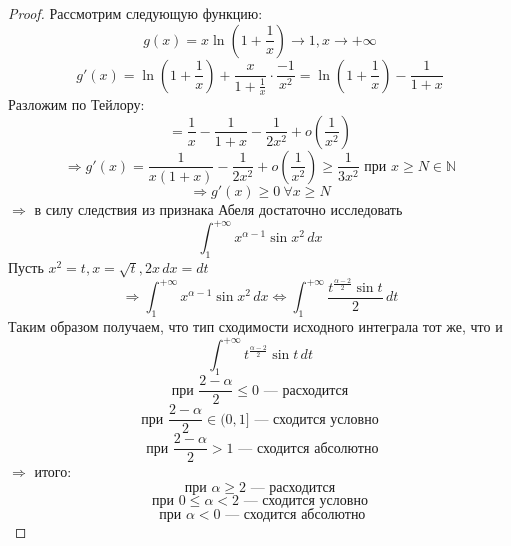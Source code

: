 \documentclass[11pt]{article}
\begin{document}
\begin{proof}
    Рассмотрим следующую функцию:
    \[ g(x) = x\ln \left(1+\frac{1}{x}\right)\to 1, x\to +\infty \]
    \[ g'(x) = \ln \left(1+\frac{1}{x}\right) +  \frac{x}{1+\frac{1}{x}} \cdot \frac{-1}{x^2}  = \ln\left(1+\frac{1}{x}\right) - \frac{1}{1+x}  \] 
    Разложим по Тейлору:
    \[ = \frac{1}{x} - \frac{1}{1+x} - \frac{1}{2x^2} + o\left(\frac{1}{x^2}\right) \]
    \[ \Rightarrow g'(x) =   \frac{1}{x(1+x)} - \frac{1}{2x^2} + o\left(\frac{1}{x^2} \right)\ge \frac{1}{3x^2} \text{ при } x\ge N\in \mathbb{N} \] 
    \[ \Rightarrow g'(x)\ge 0 \ \forall x\ge N \] 
    $\Rightarrow$ в силу следствия из признака Абеля достаточно исследовать
    \[ \int_{1}^{+\infty} x^{\alpha -1 } \sin x^2 \, dx \]
    Пусть $x^2=t, x=\sqrt{t}, 2x\, dx = dt $ 
    \[ \Rightarrow \int_{1}^{+\infty} x^{\alpha -1 } \sin x^2 \, dx \Leftrightarrow \int_{1}^{+\infty} \frac{t^{\frac{\alpha-2}{2}}\sin t}{2} \, dt \]
    Таким образом получаем, что тип сходимости исходного интеграла тот же, что и
    \[ \int_{1}^{+\infty}  t^{\frac{\alpha-2}{2}}\sin t \, dt \]
    \[ \text{ при } \frac{2-\alpha}{2}\le 0 \text{ --- расходится } \]
    \[ \text{ при } \frac{2-\alpha}{2}\in (0,1] \text{ --- сходится условно } \]
    \[ \text{ при } \frac{2-\alpha}{2}>1 \text{ ---  сходится абсолютно} \]
    $\Rightarrow$ итого: 
    \[ \text{ при } \alpha \ge 2\text{ --- расходится } \]
    \[ \text{ при } 0\le \alpha <2 \text{ --- сходится условно } \]
    \[ \text{ при } \alpha<0  \text{ ---  сходится абсолютно} \] 
\end{proof}
\end{document}

